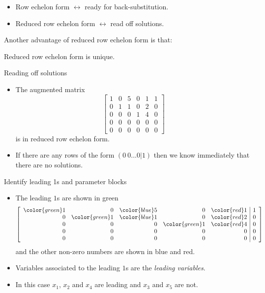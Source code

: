 \documentclass{beamer}
\begin{document}
\begin{frame}
  \begin{itemize}
  \item Row echelon form $\leftrightarrow$ ready for back-substitution.\vfill
  \item Reduced row echelon form $\leftrightarrow$ read off solutions.
  \end{itemize}\vfill
  Another advantage of reduced row echelon form is that:\vfill
  \begin{theorem}
    Reduced row echelon form is unique.
  \end{theorem}
\end{frame}

\begin{frame}{Reading off solutions}
  \begin{itemize}
  \item   The augmented matrix
    \begin{equation*}
      \left[\begin{array}{rrrrr|r}
               1 & 0 & 5 & 0 & 1 &1 \\
               0 & 1 & 1 & 0 & 2 &0 \\
               0 & 0 & 0 & 1 & 4 &0 \\
               0 & 0 & 0 & 0 & 0 &0\\
               0 & 0 & 0 & 0 & 0 &0
            \end{array}\right] 
        \end{equation*}
        is in reduced row echelon form.\vfill
      \item If there are any rows of the form $(0~ 0...0|1)$ then we know immediately that there are no solutions.
  \end{itemize}
\end{frame}

\begin{frame}{Identify leading 1s and parameter blocks}
  \begin{itemize}
  \item The leading $1$s are shown in green
    \begin{equation*}
      \left[\begin{array}{rrrrr|r}
               {\color{green}1} & 0 & {\color{blue}5} & 0 & {\color{red}1} &1 \\
               0 & {\color{green}1} & {\color{blue}1} & 0 & {\color{red}2} &0 \\
               0 & 0 & 0 & {\color{green}1} & {\color{red}4} &0 \\
               0 & 0 & 0 & 0 & 0 &0\\
               0 & 0 & 0 & 0 & 0 &0
            \end{array}\right] 
        \end{equation*}
        and the other non-zero numbers are shown in blue and red.\vfill
      \item Variables associated to the leading $1$s are the \emph{leading variables}.\vfill
      \item In this case $x_1$, $x_2$ and $x_4$ are leading and $x_3$ and $x_5$ are not.
  \end{itemize}
\end{frame}
\end{document}
